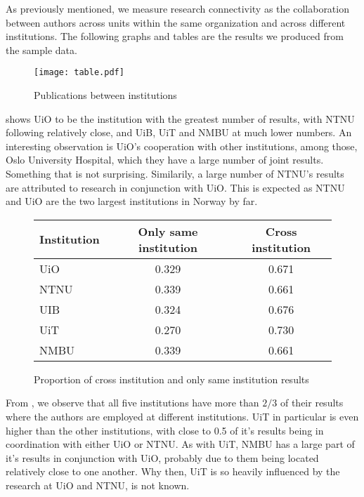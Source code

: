 As previously mentioned, we measure research connectivity as the collaboration between authors across units within the same organization and across different institutions. The following graphs and tables are the results we produced from the sample data.

\begin{figure}[h]
  \centering
  \texttt{[image: table.pdf]}
  \caption{Publications between institutions}
  \label{fig:result}
\end{figure}

 shows UiO to be the institution with the greatest number of results, with NTNU following relatively close, and UiB, UiT and NMBU at much lower numbers.
An interesting observation is UiO’s cooperation with other institutions, among those, Oslo University Hospital, which they have a large number of joint results. Something that is not surprising.
Similarily, a large number of NTNU’s results are attributed to research in conjunction with UiO. This is expected as NTNU and UiO are the two largest institutions in Norway by far.


\begin{figure}[h]
	\centering
	\begin{tabular}{| l || c | c |}
		\hline
		Institution	& Only same institution	& Cross institution	\\ \hline
		UiO		& 0.329			& 0.671			\\
		NTNU		& 0.339			& 0.661			\\
		UIB		& 0.324			& 0.676			\\
		UiT		& 0.270			& 0.730			\\
		NMBU		& 0.339			& 0.661			\\
		\hline
	\end{tabular}
	\caption{Proportion of cross institution and only same institution results}
	\label{tab:institution-proportion}
\end{figure}

From , we observe that all five institutions have more than $2/3$ of their results where the authors are employed at different institutions. UiT in particular is even higher than the other institutions, with close to 0.5 of it’s results being in coordination with either UiO or NTNU. As with UiT, NMBU has a large part of it’s results in conjunction with UiO, probably due to them being located relatively close to one another. Why then, UiT is so heavily influenced by the research at UiO and NTNU, is not known.

